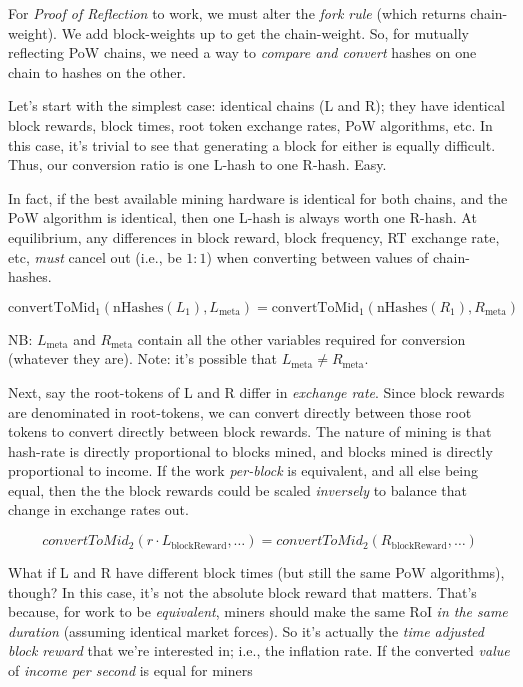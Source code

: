 For \emph{Proof of Reflection} to work, we must alter the \emph{fork rule} (which returns chain-weight).
We add block-weights up to get the chain-weight.
So, for mutually reflecting PoW chains, we need a way to \emph{compare and convert} hashes on one chain to hashes on the other.

Let's start with the simplest case: identical chains (L and R); they have identical block rewards, block times, root token exchange rates, PoW algorithms, etc.
In this case, it's trivial to see that generating a block for either is equally difficult.
Thus, our conversion ratio is one L-hash to one R-hash. Easy.

In fact, if the best available mining hardware is identical for both chains, and the PoW algorithm is identical, then one L-hash is always worth one R-hash.
At equilibrium, any differences in block reward, block frequency, RT exchange rate, etc, \emph{must} cancel out (i.e., be $1:1$) when converting between values of chain-hashes.

$$
\text{convertToMid}_1(\text{nHashes}(L_1), L_{\text{meta}}) = \text{convertToMid}_1(\text{nHashes}(R_1), R_{\text{meta}})
$$

NB: $L_\text{meta}$ and $R_\text{meta}$ contain all the other variables required for conversion (whatever they are). Note: it's possible that $L_\text{meta} \ne R_\text{meta}$.

Next, say the root-tokens of L and R differ in \emph{exchange rate}.
Since block rewards are denominated in root-tokens, we can convert directly between those root tokens to convert directly between block rewards.
The nature of mining is that hash-rate is directly proportional to blocks mined, and blocks mined is directly proportional to income.
If the work \emph{per-block} is equivalent, and all else being equal, then the the block rewards could be scaled \emph{inversely} to balance that change in exchange rates out.

$$
convertToMid_2(r\cdot L_\text{blockReward}, \dots) = convertToMid_2(R_\text{blockReward}, \dots)
$$

What if L and R have different block times (but still the same PoW algorithms), though?
In this case, it's not the absolute block reward that matters.
That's because, for work to be \emph{equivalent}, miners should make the same RoI \emph{in the same duration} (assuming identical market forces).
So it's actually the \emph{time adjusted block reward} that we're interested in; i.e., the inflation rate.
If the converted \emph{value} of \emph{income per second} is equal for miners
